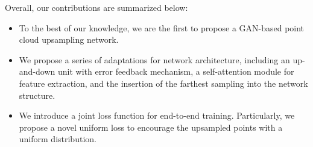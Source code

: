 Overall, our contributions are summarized below:
\begin{itemize}
	\item
	To the best of our knowledge, we are the first to propose a GAN-based point cloud upsampling network.
	\item
	We propose a series of adaptations for network architecture, including an up-and-down unit with error feedback mechanism, a self-attention module for feature extraction, and the insertion of the farthest sampling into the network structure.
	\item
	We introduce a joint loss function for end-to-end training. Particularly, we propose a novel uniform loss to encourage the upsampled points with a uniform distribution.
\end{itemize}
\fi


